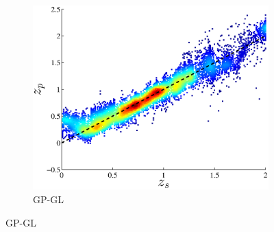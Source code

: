 \documentclass[useAMS,usenatbib,fleqn]{mn2e}
\begin{document}
\begin{figure}
        ~
        \begin{subfigure}[b]{0.3\textwidth}
                \includegraphics[width=\textwidth]{figures/GPGL.eps}
                \caption{GP-GL}
                \label{GPGL-plot}
        \end{subfigure}
        

\end{figure}
\end{document}
